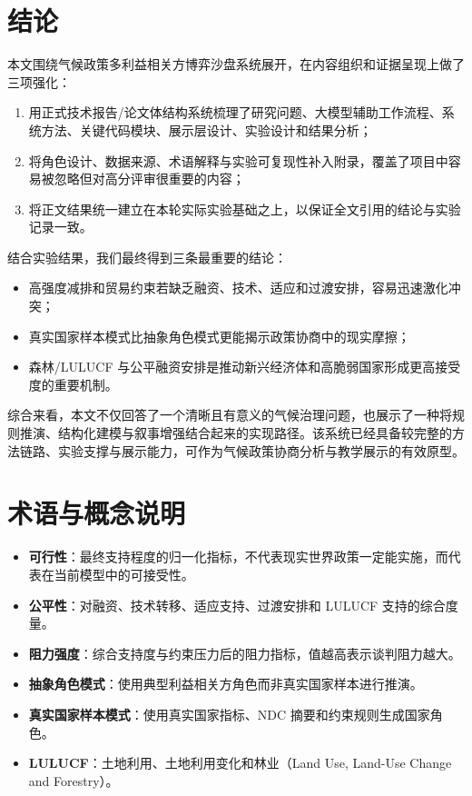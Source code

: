 \documentclass[12pt,a4paper]{ctexart}
\begin{document}
\section{结论}
本文围绕气候政策多利益相关方博弈沙盘系统展开，在内容组织和证据呈现上做了三项强化：
\begin{enumerate}
  \item 用正式技术报告/论文体结构系统梳理了研究问题、大模型辅助工作流程、系统方法、关键代码模块、展示层设计、实验设计和结果分析；
  \item 将角色设计、数据来源、术语解释与实验可复现性补入附录，覆盖了项目中容易被忽略但对高分评审很重要的内容；
  \item 将正文结果统一建立在本轮实际实验基础之上，以保证全文引用的结论与实验记录一致。
\end{enumerate}

结合实验结果，我们最终得到三条最重要的结论：
\begin{itemize}
  \item 高强度减排和贸易约束若缺乏融资、技术、适应和过渡安排，容易迅速激化冲突；
  \item 真实国家样本模式比抽象角色模式更能揭示政策协商中的现实摩擦；
  \item 森林/LULUCF 与公平融资安排是推动新兴经济体和高脆弱国家形成更高接受度的重要机制。
\end{itemize}

综合来看，本文不仅回答了一个清晰且有意义的气候治理问题，也展示了一种将规则推演、结构化建模与叙事增强结合起来的实现路径。该系统已经具备较完整的方法链路、实验支撑与展示能力，可作为气候政策协商分析与教学展示的有效原型。

\appendix

\section{术语与概念说明}
\begin{itemize}
  \item \textbf{可行性}：最终支持程度的归一化指标，不代表现实世界政策一定能实施，而代表在当前模型中的可接受性。
  \item \textbf{公平性}：对融资、技术转移、适应支持、过渡安排和 LULUCF 支持的综合度量。
  \item \textbf{阻力强度}：综合支持度与约束压力后的阻力指标，值越高表示谈判阻力越大。
  \item \textbf{抽象角色模式}：使用典型利益相关方角色而非真实国家样本进行推演。
  \item \textbf{真实国家样本模式}：使用真实国家指标、NDC 摘要和约束规则生成国家角色。
  \item \textbf{LULUCF}：土地利用、土地利用变化和林业（Land Use, Land-Use Change and Forestry）。
\end{itemize}
\end{document}
